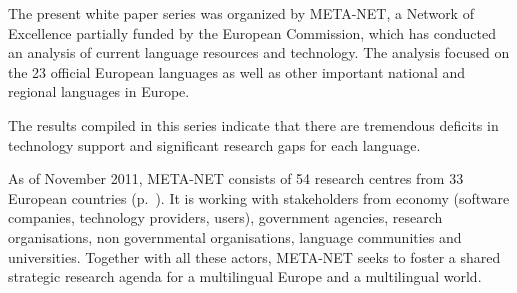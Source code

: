 \begin{Parallel}[c]{78mm}{78mm}
{The present white paper series was organized by META-NET, a Network of Excellence partially funded by the European Commission, 
which has conducted an  analysis of current language resources and technology. 
The analysis focused on the 23 official European languages as well as other important national and regional languages in Europe. 

The results compiled in this series indicate that there are tremendous deficits in technology support and significant research gaps for each language.

As of November 2011, META-NET consists of 54 research centres from 33 European countries (p.~\pageref{metanetmembers}). It is working with stakeholders from economy (software companies, technology providers, users), government agencies, research organisations, non governmental organisations, language communities and universities. Together with all these actors, META-NET seeks to foster a shared strategic research agenda for a multilingual Europe and a multilingual world.} 
\ParallelPar
\end{Parallel}


\cleardoublepage


\tableofcontents



\cleardoublepage

\setcounter{page}{1}
\pagestyle{scrheadings}



